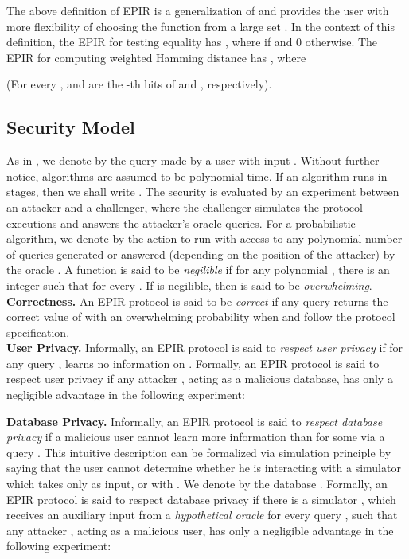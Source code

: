 \documentclass[JMC]{degruyter-journal}
\begin{document}
The above definition of EPIR is a generalization of  \cite{BCPT07}
and provides the user with more flexibility of choosing the function
 from a large set  .
 In the context of this definition, the EPIR
for testing equality  \cite{BCPT07} has  , where  if  and 0
otherwise.
The
EPIR  for computing weighted Hamming distance \cite{BCPT07}
has , where

 (For every ,  and  are the -th bits of  and
, respectively).


\subsection{Security Model}\label{sec:security_model}

As in \cite{BC09,BCPT07}, we denote by  the
query made by a user with input .
Without further notice, algorithms are assumed to be
polynomial-time. If an algorithm  runs in 
stages,  then we shall write . The security is evaluated by an experiment between an
attacker and a challenger, where the challenger simulates the
protocol executions and answers the attacker's oracle queries.
 For  a probabilistic algorithm, we denote
by 
 the action to run  with access to any polynomial number of 
 queries
generated or answered (depending on the position of the attacker) by
the oracle . A function  is said to be {\em negilible} if for any polynomial ,
there is an integer  such that  for every
. If  is  negilible, then  is said to
be
{\em overwhelming}.\\
{\bf Correctness.} An EPIR protocol is said to be {\em correct} if
any query 
 returns the correct value of  with an overwhelming probability when  and
  follow the protocol specification.\\
{\bf User Privacy.} Informally, an EPIR protocol is said to {\em
respect  user privacy} if for any query ,
 learns no information on  . Formally, an EPIR
protocol is said to respect user privacy if any attacker
, acting as a malicious database, has only a
negligible advantage  in the
following experiment:


\vspace{-0.25cm}
 {\bf Database Privacy.} Informally, an EPIR protocol is
said to {\em respect database privacy}
 if a malicious user  cannot learn more information than  for
some   via a
query . This intuitive description  can be
formalized via simulation principle by saying that the user
 cannot determine whether he is interacting with a
simulator which takes  only  as input, or with . We
denote by  the database . Formally, an
EPIR protocol is said to respect database privacy if there is a
simulator
 ,  which receives  an
auxiliary input  from a
{\em hypothetical oracle}
  for every query
, such that any attacker , acting as a malicious user, has only
a negligible advantage  in the
following experiment:
\end{document}
